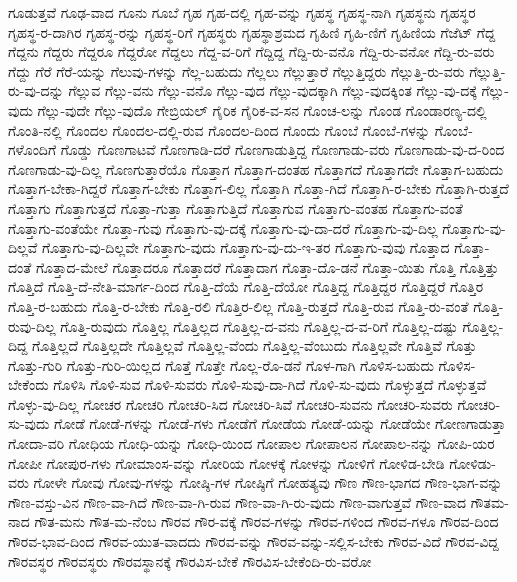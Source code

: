 {ಗೂಡುತ್ತವೆ
ಗೂಢ-ವಾದ
ಗೂನು
ಗೂಬೆ
ಗೃಹ
ಗೃಹ-ದಲ್ಲಿ
ಗೃಹ-ವನ್ನು
ಗೃಹಸ್ಥ
ಗೃಹಸ್ಥ-ನಾಗಿ
ಗೃಹಸ್ಥನು
ಗೃಹಸ್ಥರ
ಗೃಹಸ್ಥ-ರ-ದಾಗಿರ
ಗೃಹಸ್ಥ-ರನ್ನು
ಗೃಹಸ್ಥ-ರಿಗೆ
ಗೃಹಸ್ಥರು
ಗೃಹಸ್ಥಾಶ್ರಮದ
ಗೃಹಿಣಿ
ಗೃಹಿ-ಣಿಗೆ
ಗೃಹಿಣಿಯ
ಗೆಜೆಟ್
ಗೆದ್ದ
ಗೆದ್ದನು
ಗೆದ್ದರು
ಗೆದ್ದರೂ
ಗೆದ್ದರೋ
ಗೆದ್ದಲು
ಗೆದ್ದ-ವ-ರಿಗೆ
ಗೆದ್ದಿದ್ದ
ಗೆದ್ದಿ-ರು-ವನೊ
ಗೆದ್ದಿ-ರು-ವನೋ
ಗೆದ್ದಿ-ರು-ವರು
ಗೆದ್ದು
ಗೆರೆ
ಗೆರೆ-ಯನ್ನು
ಗೆಲುವು-ಗಳನ್ನು
ಗೆಲ್ಲ-ಬಹುದು
ಗೆಲ್ಲಲು
ಗೆಲ್ಲುತ್ತಾರೆ
ಗೆಲ್ಲುತ್ತಿದ್ದರು
ಗೆಲ್ಲುತ್ತಿ-ರು-ವರು
ಗೆಲ್ಲುತ್ತಿ-ರು-ವು-ದನ್ನು
ಗೆಲ್ಲುವ
ಗೆಲ್ಲು-ವನು
ಗೆಲ್ಲು-ವನೊ
ಗೆಲ್ಲು-ವುದ
ಗೆಲ್ಲು-ವುದಕ್ಕಾಗಿ
ಗೆಲ್ಲು-ವುದಕ್ಕಿಂತ
ಗೆಲ್ಲು-ವು-ದಕ್ಕೆ
ಗೆಲ್ಲು-ವುದು
ಗೆಲ್ಲು-ವುದೇ
ಗೆಲ್ಲು-ವುದೊ
ಗೇಬ್ರಿಯಲ್
ಗೈರಿಕ
ಗೈರಿಕ-ವ-ಸನ
ಗೊಂಚ-ಲನ್ನು
ಗೊಂಡ
ಗೊಂಡಾರಣ್ಯ-ದಲ್ಲಿ
ಗೊಂತಿ-ನಲ್ಲಿ
ಗೊಂದಲ
ಗೊಂದಲ-ದಲ್ಲಿ-ರುವ
ಗೊಂದಲ-ದಿಂದ
ಗೊಂದು
ಗೊಂಬೆ
ಗೊಂಬೆ-ಗಳನ್ನು
ಗೊಂಬೆ-ಗಳೊಂದಿಗೆ
ಗೊಡ್ಡು
ಗೊಣಗಾಟವೆ
ಗೊಣಗಾಡಿ-ದರೆ
ಗೊಣಗಾಡುತ್ತಿದ್ದ
ಗೊಣಗಾಡು-ವರು
ಗೊಣಗಾಡು-ವು-ದ-ರಿಂದ
ಗೊಣಗಾಡು-ವು-ದಿಲ್ಲ
ಗೊಣಗುತ್ತಾರೆಯೊ
ಗೊತ್ತಾಗ
ಗೊತ್ತಾಗ-ದಂತಹ
ಗೊತ್ತಾಗದೆ
ಗೊತ್ತಾಗದೇ
ಗೊತ್ತಾಗ-ಬಹುದು
ಗೊತ್ತಾಗ-ಬೇಕಾ-ಗಿದ್ದರೆ
ಗೊತ್ತಾಗ-ಬೇಕು
ಗೊತ್ತಾಗ-ಲಿಲ್ಲ
ಗೊತ್ತಾಗಿ
ಗೊತ್ತಾ-ಗಿದೆ
ಗೊತ್ತಾಗಿ-ರ-ಬೇಕು
ಗೊತ್ತಾಗಿ-ರುತ್ತದೆ
ಗೊತ್ತಾಗು
ಗೊತ್ತಾಗುತ್ತದೆ
ಗೊತ್ತಾ-ಗುತ್ತಾ
ಗೊತ್ತಾಗುತ್ತಿದೆ
ಗೊತ್ತಾಗುವ
ಗೊತ್ತಾಗು-ವಂತಹ
ಗೊತ್ತಾಗು-ವಂತೆ
ಗೊತ್ತಾಗು-ವಂತೆಯೇ
ಗೊತ್ತಾ-ಗುವು
ಗೊತ್ತಾಗು-ವು-ದಕ್ಕೆ
ಗೊತ್ತಾಗು-ವು-ದಾ-ದರೆ
ಗೊತ್ತಾಗು-ವು-ದಿಲ್ಲ
ಗೊತ್ತಾಗು-ವು-ದಿಲ್ಲವೆ
ಗೊತ್ತಾಗು-ವು-ದಿಲ್ಲವೇ
ಗೊತ್ತಾಗು-ವುದು
ಗೊತ್ತಾಗು-ವು-ದು-ಇ-ತರ
ಗೊತ್ತಾಗು-ವುವು
ಗೊತ್ತಾದ
ಗೊತ್ತಾ-ದಂತೆ
ಗೊತ್ತಾದ-ಮೇಲೆ
ಗೊತ್ತಾದರೂ
ಗೊತ್ತಾದರೆ
ಗೊತ್ತಾದಾಗ
ಗೊತ್ತಾ-ದೊ-ಡನೆ
ಗೊತ್ತಾ-ಯಿತು
ಗೊತ್ತಿ
ಗೊತ್ತಿತ್ತು
ಗೊತ್ತಿದೆ
ಗೊತ್ತಿ-ದೆ-ನೇತಿ-ಮಾರ್ಗ-ದಿಂದ
ಗೊತ್ತಿ-ದೆಯೆ
ಗೊತ್ತಿ-ದೆಯೋ
ಗೊತ್ತಿದ್ದ
ಗೊತ್ತಿದ್ದರ
ಗೊತ್ತಿದ್ದರೆ
ಗೊತ್ತಿರ
ಗೊತ್ತಿ-ರ-ಬಹುದು
ಗೊತ್ತಿ-ರ-ಬೇಕು
ಗೊತ್ತಿ-ರಲಿ
ಗೊತ್ತಿರ-ಲಿಲ್ಲ
ಗೊತ್ತಿ-ರುತ್ತದೆ
ಗೊತ್ತಿ-ರುವ
ಗೊತ್ತಿ-ರು-ವಂತೆ
ಗೊತ್ತಿ-ರುವು-ದಿಲ್ಲ
ಗೊತ್ತಿ-ರುವುದು
ಗೊತ್ತಿಲ್ಲ
ಗೊತ್ತಿಲ್ಲದ
ಗೊತ್ತಿಲ್ಲ-ದ-ವನು
ಗೊತ್ತಿಲ್ಲ-ದ-ವ-ರಿಗೆ
ಗೊತ್ತಿಲ್ಲ-ದಷ್ಟು
ಗೊತ್ತಿಲ್ಲ-ದಿದ್ದ
ಗೊತ್ತಿಲ್ಲದೆ
ಗೊತ್ತಿಲ್ಲದೇ
ಗೊತ್ತಿಲ್ಲವೆ
ಗೊತ್ತಿಲ್ಲ-ವೆಂದು
ಗೊತ್ತಿಲ್ಲ-ವೆಂಬುದು
ಗೊತ್ತಿಲ್ಲವೇ
ಗೊತ್ತಿವೆ
ಗೊತ್ತು
ಗೊತ್ತು-ಗುರಿ
ಗೊತ್ತು-ಗುರಿ-ಯಿಲ್ಲದ
ಗೊತ್ತೆ
ಗೊತ್ತೇ
ಗೊಲ್ಲ-ರೊ-ಡನೆ
ಗೊಳ-ಗಾಗಿ
ಗೊಳಿಸ-ಬಹುದು
ಗೊಳಿಸ-ಬೇಕೆಂದು
ಗೊಳಿಸಿ
ಗೊಳಿ-ಸುವ
ಗೊಳಿ-ಸುವರು
ಗೊಳಿ-ಸುವು-ದಾ-ಗಿದೆ
ಗೊಳಿ-ಸು-ವುದು
ಗೊಳ್ಳುತ್ತದೆ
ಗೊಳ್ಳುತ್ತವೆ
ಗೊಳ್ಳು-ವು-ದಿಲ್ಲ
ಗೋಚರ
ಗೋಚರಿ
ಗೋಚರಿ-ಸಿದ
ಗೋಚರಿ-ಸಿವೆ
ಗೋಚರಿ-ಸುವನು
ಗೋಚರಿ-ಸುವರು
ಗೋಚರಿ-ಸು-ವುದು
ಗೋಡೆ
ಗೋಡೆ-ಗಳನ್ನು
ಗೋಡೆ-ಗಳು
ಗೋಡೆಗೆ
ಗೋಡೆಯ
ಗೋಡೆ-ಯನ್ನು
ಗೋಡೆಯೇ
ಗೋಣಗಾಡುತ್ತಾ
ಗೋದಾ-ವರಿ
ಗೋಧಿಯ
ಗೋಧಿ-ಯನ್ನು
ಗೋಧಿ-ಯಿಂದ
ಗೋಪಾಲ
ಗೋಪಾಲನ
ಗೋಪಾಲ-ನನ್ನು
ಗೋಪಿ-ಯರ
ಗೋಪೀ
ಗೋಪುರ-ಗಳು
ಗೋಮಾಂಸ-ವನ್ನು
ಗೋರಿಯ
ಗೋಳಕ್ಕೆ
ಗೋಳನ್ನು
ಗೋಳಿಗೆ
ಗೋಳಿಡ-ಬೇಡಿ
ಗೋಳಿಡು-ವರು
ಗೋಳೇ
ಗೋವು
ಗೋವು-ಗಳನ್ನು
ಗೋಷ್ಠಿ-ಗಳ
ಗೋಷ್ಠಿಗೆ
ಗೋಹತ್ಯವು
ಗೌಣ
ಗೌಣ-ಭಾಗದ
ಗೌಣ-ಭಾಗ-ವನ್ನು
ಗೌಣ-ವಸ್ತು-ವಿನ
ಗೌಣ-ವಾ-ಗಿದೆ
ಗೌಣ-ವಾ-ಗಿ-ರುವ
ಗೌಣ-ವಾ-ಗಿ-ರು-ವುದು
ಗೌಣ-ವಾಗುತ್ತವೆ
ಗೌಣ-ವಾದ
ಗೌತಮ-ನಾದ
ಗೌತ-ಮನು
ಗೌತ-ಮ-ನೆಂಬ
ಗೌರವ
ಗೌರ-ವಕ್ಕೆ
ಗೌರವ-ಗಳನ್ನು
ಗೌರವ-ಗಳಿಂದ
ಗೌರವ-ಗಳೂ
ಗೌರವ-ದಿಂದ
ಗೌರವ-ಭಾವ-ದಿಂದ
ಗೌರವ-ಯುತ-ವಾದದು
ಗೌರವ-ವನ್ನು
ಗೌರವ-ವನ್ನು-ಸಲ್ಲಿಸ-ಬೇಕು
ಗೌರವ-ವಿದೆ
ಗೌರವ-ವಿದ್ದ
ಗೌರವಸ್ಥರ
ಗೌರವಸ್ಥರು
ಗೌರವಸ್ಥಾನಕ್ಕೆ
ಗೌರವಿಸ-ಬೇಕೆ
ಗೌರವಿಸ-ಬೇಕೆಂದಿ-ರು-ವರೋ
}
